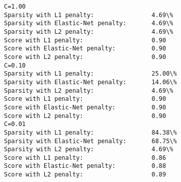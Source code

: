 \begin{Verbatim}[commandchars=\\\{\}]
C=1.00
Sparsity with L1 penalty:                4.69\%
Sparsity with Elastic-Net penalty:       4.69\%
Sparsity with L2 penalty:                4.69\%
Score with L1 penalty:                   0.90
Score with Elastic-Net penalty:          0.90
Score with L2 penalty:                   0.90
C=0.10
Sparsity with L1 penalty:                25.00\%
Sparsity with Elastic-Net penalty:       14.06\%
Sparsity with L2 penalty:                4.69\%
Score with L1 penalty:                   0.90
Score with Elastic-Net penalty:          0.90
Score with L2 penalty:                   0.90
C=0.01
Sparsity with L1 penalty:                84.38\%
Sparsity with Elastic-Net penalty:       68.75\%
Sparsity with L2 penalty:                4.69\%
Score with L1 penalty:                   0.86
Score with Elastic-Net penalty:          0.88
Score with L2 penalty:                   0.89
\end{Verbatim}
